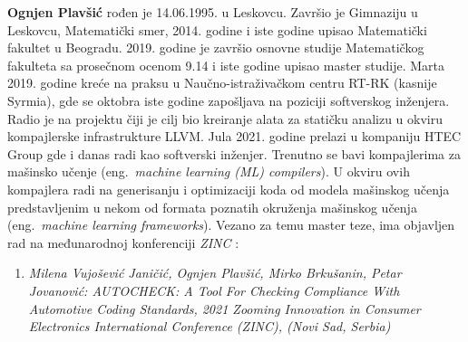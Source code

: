 \documentclass[12pt,oneside]{memoir}
\begin{document}
\literatura

\backmatter

\begin{biografija}
  \textbf{Ognjen Plavšić} rođen je 14.06.1995. u Leskovcu. Zavr\v{s}io je Gimnaziju u Leskovcu, Matemati\v{c}ki smer, 2014. godine
  i iste godine upisao Matemati\v{c}ki fakultet u Beogradu. 2019. godine je zavr\v{s}io osnovne studije Matemati\v{c}kog fakulteta sa prose\v{c}nom ocenom 9.14 i iste
  godine upisao master studije. Marta 2019. godine kre\'{c}e na praksu u Nau\v{c}no-istra\v{z}iva\v{c}kom centru RT-RK (kasnije Syrmia), gde
  se oktobra iste godine zapo\v{s}ljava na poziciji softverskog in\v{z}enjera. Radio je na projektu \v{c}iji je cilj bio kreiranje alata za stati\v{c}ku analizu u okviru kompajlerske infrastrukture
  LLVM. Jula 2021. godine prelazi u kompaniju HTEC Group gde i danas
  radi kao softverski in\v{z}enjer. Trenutno se bavi kompajlerima za ma\v{s}insko u\v{c}enje
  (eng.~\textit{machine learning (ML) compilers}). U okviru ovih kompajlera radi na generisanju i optimizaciji koda od modela ma\v{s}inskog u\v{c}enja predstavljenim u nekom od formata poznatih okru\v{z}enja ma\v{s}inskog u\v{c}enja (eng.~\textit{machine learning frameworks}). Vezano za temu master teze, ima objavljen rad na međunarodnoj konferenciji \textit{ZINC} \cite{AutoCheck}: \par
  \begin{enumerate}
    \item{\textit{Milena Vujo\v{s}evi\'{c} Jani\v{c}i\'{c}, Ognjen Plav\v{s}i\'{c}, Mirko Brku\v{s}anin, Petar Jovanovi\'{c}: AUTOCHECK: A Tool For Checking Compliance With Automotive Coding Standards, 2021 Zooming Innovation in Consumer Electronics International Conference (ZINC), (Novi Sad, Serbia)}
    }
    
  \end{enumerate}

\end{biografija}
\end{document}
